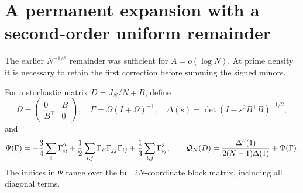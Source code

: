 \section{A permanent expansion with a second-order uniform remainder}
\label{sec:secondpermanent}
The earlier \(N^{-1/8}\) remainder was sufficient for
\(A=o(\log N)\). At prime density it is necessary to retain
the first correction before summing the signed minors.

For a stochastic matrix \(D=J_N/N+B\), define
\[
 \Omega=\begin{pmatrix}0&B\\B^\top&0\end{pmatrix},\quad
 \Gamma=\Omega(I+\Omega)^{-1},\quad
 \Delta(s)=\det(I-s^2B^\top B)^{-1/2},
\]
and
\[
 \Psi(\Gamma)=
 -\frac34\sum_i\Gamma_{ii}^2
 +\frac12\sum_{i,j}\Gamma_{ii}\Gamma_{jj}\Gamma_{ij}
 +\frac13\sum_{i,j}\Gamma_{ij}^3,\qquad
 {\cal Q}_N(D)=\frac{\Delta''(1)}{2(N-1)\Delta(1)}
                                     +\Psi(\Gamma).
\]
The indices in \(\Psi\) range over the full \(2N\)-coordinate
block matrix, including all diagonal terms.

